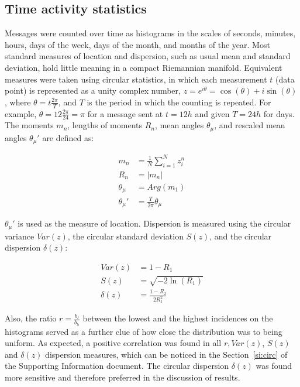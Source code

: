 \documentclass[%
	aip,
	jmp,%
	amsmath,amssymb,
	reprint,%
]{revtex4-1}
\begin{document}
\subsection{Time activity statistics}\label{sec:mtime}
Messages were counted over time as histograms in the scales of seconds,
minutes, hours, days of the week, days of the month, and months of the year.
Most standard measures of location and dispersion, such as usual mean and
standard deviation, hold little meaning in a compact Riemannian manifold.
Equivalent measures were taken using circular statistics,
in which each measurement $t$ (data point) is represented as a unity complex number,
$z=e^{i\theta}=\cos(\theta)+i\sin(\theta)$, where $\theta=t\frac{2\pi}{T}$,
and $T$ is the period in which the counting is repeated.
For example, $\theta=12\frac{2\pi}{24}=\pi$ for a message sent at $t=12h$ and given $T=24h$ for days.
The moments $m_n$, lengths of moments $R_n$, mean angles $\theta_\mu$, and rescaled mean angles $\theta_\mu'$ are defined as:

\begin{align}\label{eq:cmom}
	m_n&=\frac{1}{N}\sum_{i=1}^N z_i^n \nonumber\\
	R_n&=|m_n|\\
	\theta_\mu&=Arg(m_1) \nonumber \\
	\theta_\mu'&=\frac{T}{2\pi} \theta_\mu \nonumber
\end{align}

$\theta_\mu'$ is used as the measure of location.
Dispersion is measured using the circular variance $Var(z)$,
the circular standard deviation $S(z)$, and the circular dispersion $\delta(z)$:

\begin{align}\label{eq:cmd}
	Var(z)&=1 - R_1 \nonumber\\
	S(z)&= \sqrt{-2\ln(R_1)}\\
	\delta(z)&=\frac{1-R_2}{2 R_1^2} \nonumber
\end{align}

\noindent
Also, the ratio $r=\frac{b_l}{b_h}$ between the lowest and the highest incidences on the histograms 
served as a further clue of how close the distribution was to being uniform.
As expected, a positive correlation was found in all $r, Var(z)$, $S(z)$ and $\delta(z)$ dispersion measures,
which can be noticed in the Section~\ref{si:circ} of the Supporting Information document.
The circular dispersion $\delta(z)$ was found more sensitive and therefore preferred in the discussion of results.
\end{document}
